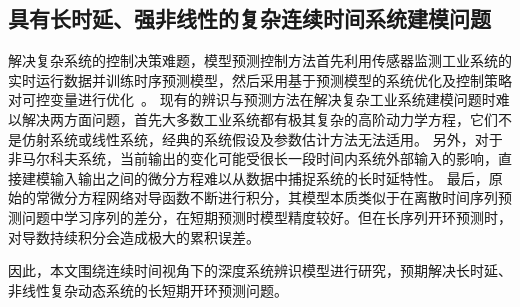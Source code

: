 \subsection{具有长时延、强非线性的复杂连续时间系统建模问题}
解决复杂系统的控制决策难题，模型预测控制方法首先利用传感器监测工业系统的实时运行数据并训练时序预测模型，然后采用基于预测模型的系统优化及控制策略对可控变量进行优化~\cite{Yuan2020,Member2019,wu2020optimization}。
现有的辨识与预测方法在解决复杂工业系统建模问题时难以解决两方面问题，首先大多数工业系统都有极其复杂的高阶动力学方程，它们不是仿射系统或线性系统，经典的系统假设及参数估计方法无法适用。
另外，对于非马尔科夫系统，当前输出的变化可能受很长一段时间内系统外部输入的影响，直接建模输入输出之间的微分方程难以从数据中捕捉系统的长时延特性。
最后，原始的常微分方程网络对导函数不断进行积分，其模型本质类似于在离散时间序列预测问题中学习序列的差分，在短期预测时模型精度较好。但在长序列开环预测时，对导数持续积分会造成极大的累积误差。

因此，本文围绕连续时间视角下的深度系统辨识模型进行研究，预期解决长时延、非线性复杂动态系统的长短期开环预测问题。

